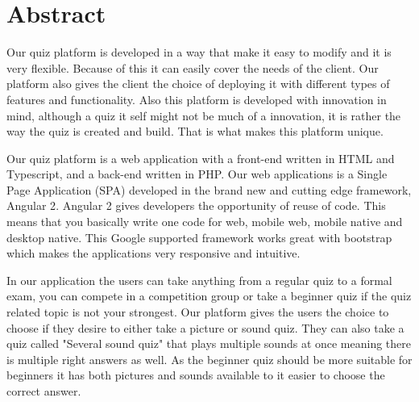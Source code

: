 \chapter{Abstract}
\label{chap:abstract}

Our quiz platform is developed in a way that make it easy to modify and it is very flexible. Because of this it can easily cover the needs of the client. Our platform also gives the client the choice of deploying it with different types of features and functionality. Also this platform is developed with innovation in mind, although a quiz it self might not be much of a innovation, it is rather the way the quiz is created and build. That is what makes this platform unique.

Our quiz platform is a web application with a front-end written in HTML and Typescript, and a back-end written in PHP. Our web applications is a Single Page Application (SPA) developed in the brand new and cutting edge framework, Angular 2\cite{Angular2:online}. Angular 2 gives developers the opportunity of reuse of code. This means that you basically write one code for web, mobile web, mobile native and desktop native. This Google supported framework works great with bootstrap which makes the applications very responsive and intuitive. 

In our application the users can take anything from a regular quiz to a formal exam, you can compete in a competition group or take a beginner quiz if the quiz related topic is not your strongest. Our platform gives the users the choice to choose if they desire to either take a picture or sound quiz. They can also take a quiz called "Several sound quiz" that plays multiple sounds at once meaning there is multiple right answers as well. As the beginner quiz should be more suitable for beginners it has both pictures and sounds available to it easier to choose the correct answer.